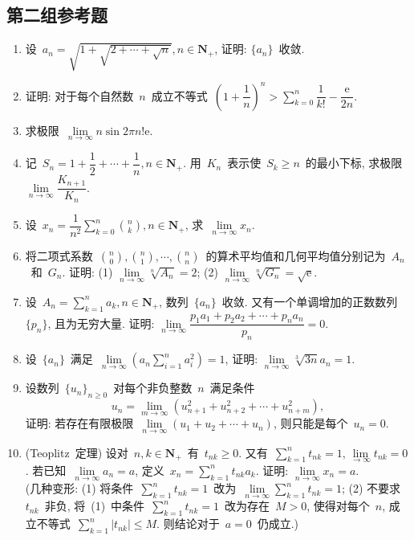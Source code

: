 \documentclass[UTF8,a4paper,11pt,twoside]{book}
\newcommand{\e}{\mathrm e}
\begin{document}
\subsection{第二组参考题}
\begin{enumerate}
	\item 设~$a_n=\sqrt{1+\sqrt{2+\cdots+\sqrt{n}}}, n\in\mathbf{N}_{+}$, 证明: $\{a_n\}$~收敛.

	\item 证明: 对于每个自然数~$n$~成立不等式~$\left(1+\dfrac{1}{n}\right)^n>\sum\limits_{k=0}^n\dfrac{1}{k!}-\dfrac{\e}{2n}$.

	\item 求极限~$\lim\limits_{n\to\infty} n\sin{2\pi n!\e}$.

	\item 记~$S_n=1+\dfrac{1}{2}+\cdots+\dfrac{1}{n}, n\in\mathbf{N}_{+}$. 用~$K_n$~表示使~$S_k\geqslant n$~的最小下标, 求极限~$\lim\limits_{n\to\infty} \dfrac{K_{n+1}}{K_n}$.

	\item 设~$x_n=\dfrac{1}{n^2}\displaystyle\sum\limits_{k=0}^n\binom{n}{k}, n\in\mathbf{N}_{+}$, 求~$\lim\limits_{n\to\infty} x_n$.

	\item 将二项式系数~$\displaystyle\binom{n}{0}, \binom{n}{1}, \cdots, \binom{n}{n}$~的算术平均值和几何平均值分别记为~$A_n$~和~$G_n$. 证明: (1) $\lim\limits_{n\to\infty} \sqrt[n]{A_n}=2$; (2) $\lim\limits_{n\to\infty} \sqrt[n]{G_n}=\sqrt{\e}$.

	\item 设~$A_n=\displaystyle\sum\limits_{k=1}^n a_k, n\in\mathbf{N}_{+}$, 数列~$\{a_n\}$~收敛. 又有一个单调增加的正数数列~$\{p_n\}$, 且为无穷大量. 证明: $\lim\limits_{n\to\infty} \dfrac{p_1a_1+p_2a_2+\cdots+p_na_n}{p_n}=0$.

	\item 设~$\{a_n\}$~满足~$\lim\limits_{n\to\infty} (a_n\displaystyle\sum_{i=1}^n a_i^2)=1$, 证明: $\lim\limits_{n\to\infty} \sqrt[3]{3n} a_n=1$.

	\item 设数列~$\{u_n\}_{n\geqslant 0}$~对每个非负整数~$n$~满足条件
	      \[
		      u_n=\lim\limits_{m\to\infty} (u_{n+1}^2+u_{n+2}^2+\cdots+u_{n+m}^2),
	      \]
	      证明: 若存在有限极限~$\lim\limits_{n\to\infty} (u_1+u_2+\cdots+u_n)$, 则只能是每个~$u_n=0$.

	\item (Teoplitz~定理) 设对~$n,k\in\mathbf{N}_{+}$~有~$t_{nk}\geqslant 0$. 又有~$\displaystyle\sum\limits_{k=1}^n t_{nk}=1, \lim\limits_{\to\infty} t_{nk}=0$. 若已知~$\lim\limits_{n\to\infty} a_n=a$, 定义~$x_n=\displaystyle\sum\limits_{k=1}^nt_{nk}a_k$. 证明: $\lim\limits_{n\to\infty} x_n=a$.\\
	      (几种变形: (1) 将条件~$\displaystyle\sum\limits_{k=1}^n t_{nk}=1$~改为~$\lim\limits_{n\to\infty} \displaystyle\sum\limits_{k=1}^n t_{nk}=1$; (2) 不要求~$t_{nk}$~非负, 将~(1)~中条件~$\displaystyle\sum\limits_{k=1}^n t_{nk}=1$~改为存在~$M>0$, 使得对每个~$n$, 成立不等式~$\displaystyle\sum\limits_{k=1}^n|t_{nk}|\leqslant M$. 则结论对于~$a=0$~仍成立.)


\end{enumerate}
\end{document}
